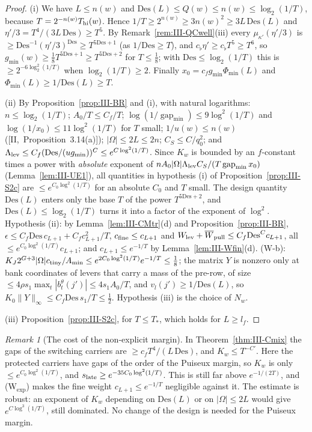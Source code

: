 \documentclass[10pt]{amsart}
\theoremstyle{definition}
\theoremstyle{remark}
\newtheorem{remark}[theorem]{Remark}
\newcommand{\gap}{\operatorname{gap}}
\begin{document}
\begin{proof}
(i) We have $L\le n(w)$ and $\mathrm{Des}(L)\le Q(w)\le n(w)\le\log_2(1/T)$, because
$T=2^{-n(w)}T_{\rm hi}(w)$.  Hence $1/T\ge2^{n(w)}\ge3n(w)^2\ge3L\,\mathrm{Des}(L)$
and $\eta'/3=T^4/(3L\,\mathrm{Des})\ge T^5$.  By Remark~\ref{rem:III-QCwell}(iii)
every $\mu_{\kappa'}(\eta'/3)$ is $\ge\mathrm{Des}^{-1}(\eta'/3)^{\mathrm{Des}}\ge
T^{5\mathrm{Des}+1}$ (as $1/\mathrm{Des}\ge T$), and $c_\flat\eta'\ge c_\flat T^5\ge T^6$,
so $g_{\min}(w)\ge\frac18T^{5\mathrm{Des}+1}\ge T^{5\mathrm{Des}+2}$ for $T\le\frac18$;
with $\mathrm{Des}\le\log_2(1/T)$ this is $\ge2^{-6\log_2^2(1/T)}$ when $\log_2(1/T)\ge2$.
Finally $x_0=c_fg_{\min}\Phi_{\min}(L)$ and $\Phi_{\min}(L)\ge1/\mathrm{Des}(L)\ge T$.

(ii) By Proposition~\ref{prop:III-BR} and (i), with natural logarithms:
$n\le\log_2(1/T)$; $A_0/T\le C_f/T$; $\log(1/\gap_{\min})\le9\log^2(1/T)$ and
$\log(1/x_0)\le11\log^2(1/T)$ for $T$ small; $1/u(w)\le n(w)$
([II,~Proposition~3.14(a)]); $|\Omega|\le2L\le2n$; $C_S\le C/q_0^2$; and
$\Lambda_{\rm lev}\le C_f(\mathrm{Des}/(ug_{\min}))^C\le e^{C\log^2(1/T)}$.  Since $K_w$ is
bounded by an $f$-constant times a power with \emph{absolute} exponent of
$nA_0|\Omega|\Lambda_{\rm lev}C_S/(T\gap_{\min}x_0)$ (Lemma~\ref{lem:III-UE1}), all
quantities in hypothesis (i) of Proposition~\ref{prop:III-S2c} are $\le
e^{C_0\log^2(1/T)}$ for an absolute $C_0$ and $T$ small.  The design quantity
$\mathrm{Des}(L)$ enters only the base $T$ of the power $T^{5\mathrm{Des}+2}$, and
$\mathrm{Des}(L)\le\log_2(1/T)$ turns it into a factor of the exponent of
$\log^2$.  Hypothesis (ii): by Lemma~\ref{lem:III-CMtr}(d) and
Proposition~\ref{prop:III-BR}, $\epsilon\le C_f\mathrm{Des}\,c_{L+1}+C_fc_{L+1}^2/T$,
$c_{\rm fine}\le c_{L+1}$ and $W_{\rm lev}+\overline W_{\rm pull}\le C_f\mathrm{Des}^Cc_{L+1}$, all
$\le e^{C_0\log^2(1/T)}c_{L+1}$; and $c_{L+1}\le e^{-1/T}$ by
Lemma~\ref{lem:III-Wfin}(d).  (W-b): $K_J2^{G+3}|\Omega|c_{\rm tiny}/A_{\min}\le
e^{2C_0\log^2(1/T)}e^{-1/T}\le\frac18$; the matrix $Y$ is nonzero only at bank
coordinates of levers that carry a mass of the pre-row, of size $\le4\rho s_1
\max_t|b^\theta_t(j')|\le4s_1A_0/T$, and $v_l(j')\ge1/\mathrm{Des}(L)$, so
$K_0\|Y\|_\infty\le C_f\mathrm{Des}\,s_1/T\le\frac12$.  Hypothesis (iii) is the choice
of $N_w$.

(iii) Proposition~\ref{prop:III-S2c}, for $T\le T_*$, which holds for $L\ge l_f$.
\end{proof}

\begin{remark}[The cost of the non-explicit margin]\label{rem:III-S2ctr}
In Theorem~\ref{thm:III-Cmix} the gaps of the switching carriers are $\ge
c_fT^4/(L\,\mathrm{Des})$, and $K_w\le T^{-C'}$.  Here the protected carriers have
gaps of the order of the Puiseux margin, so $K_w$ is only $\le
e^{C_0\log^2(1/T)}$, and $s_{\rm late}\ge e^{-35C_0\log^2(1/T)}$.  This is still far
above $e^{-1/(2T)}$, and (W$_{\exp}$) makes the fine weight $c_{L+1}\le e^{-1/T}$
negligible against it.  The estimate is robust: an exponent of $K_w$ depending
on $\mathrm{Des}(L)$ or on $|\Omega|\le2L$ would give $e^{C\log^3(1/T)}$, still
dominated.  No change of the design is needed for the Puiseux margin.
\end{remark}
\end{document}
